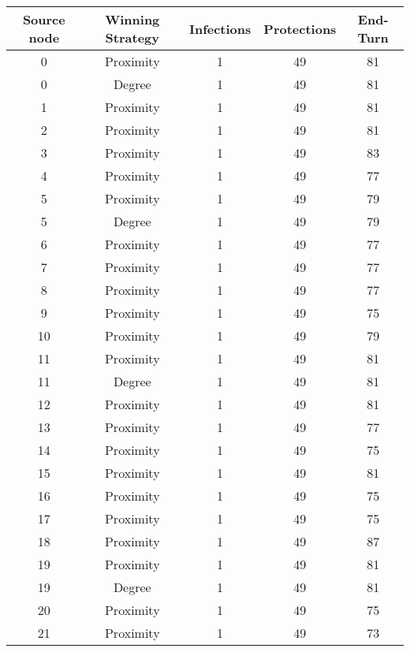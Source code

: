 \documentclass[results.tex]{subfiles}
\begin{document}
\begin{center}
  \begin{tabular}{| c || c | c | c | c |}
    \hline
    {\bfseries Source node} & {\bfseries Winning Strategy} & {\bfseries Infections} & {\bfseries Protections} & {\bfseries End-Turn} \\  %
    \hline\hline
    0 & Proximity & 1 & 49 & 81 \\ 
    \hline
    0 & Degree & 1 & 49 & 81 \\ 
    \hline
    1 & Proximity & 1 & 49 & 81 \\ 
    \hline
    2 & Proximity & 1 & 49 & 81 \\ 
    \hline
    3 & Proximity & 1 & 49 & 83 \\ 
    \hline
    4 & Proximity & 1 & 49 & 77 \\ 
    \hline
    5 & Proximity & 1 & 49 & 79 \\ 
    \hline
    5 & Degree & 1 & 49 & 79 \\ 
    \hline
    6 & Proximity & 1 & 49 & 77 \\ 
    \hline
    7 & Proximity & 1 & 49 & 77 \\ 
    \hline
    8 & Proximity & 1 & 49 & 77 \\ 
    \hline
    9 & Proximity & 1 & 49 & 75 \\ 
    \hline
    10 & Proximity & 1 & 49 & 79 \\ 
    \hline
    11 & Proximity & 1 & 49 & 81 \\ 
    \hline
    11 & Degree & 1 & 49 & 81 \\ 
    \hline
    12 & Proximity & 1 & 49 & 81 \\ 
    \hline
    13 & Proximity & 1 & 49 & 77 \\ 
    \hline
    14 & Proximity & 1 & 49 & 75 \\ 
    \hline
    15 & Proximity & 1 & 49 & 81 \\ 
    \hline
    16 & Proximity & 1 & 49 & 75 \\ 
    \hline
    17 & Proximity & 1 & 49 & 75 \\ 
    \hline
    18 & Proximity & 1 & 49 & 87 \\ 
    \hline
    19 & Proximity & 1 & 49 & 81 \\ 
    \hline
    19 & Degree & 1 & 49 & 81 \\ 
    \hline
    20 & Proximity & 1 & 49 & 75 \\ 
    \hline
    21 & Proximity & 1 & 49 & 73 \\ 

\end{tabular}
\end{center}
\end{document}
